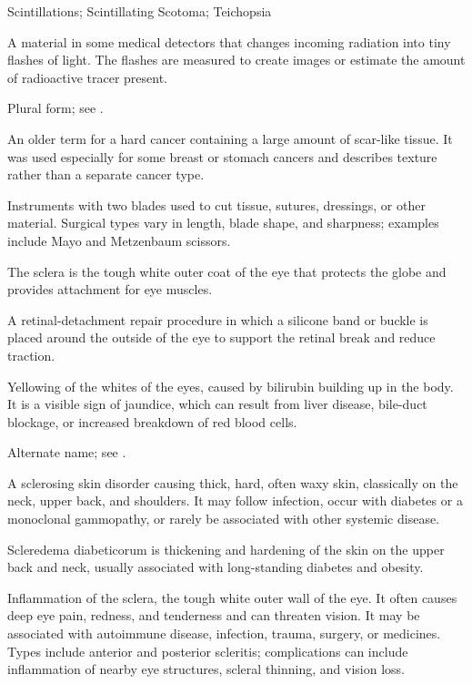 \synonyms
Scintillations; Scintillating Scotoma; Teichopsia

 A material in some medical detectors that changes incoming radiation into tiny flashes of light. The flashes are measured to create images or estimate the amount of radioactive tracer present.

 Plural form; see .

 An older term for a hard cancer containing a large amount of scar-like tissue. It was used especially for some breast or stomach cancers and describes texture rather than a separate cancer type.

 Instruments with two blades used to cut tissue, sutures, dressings, or other material. Surgical types vary in length, blade shape, and sharpness; examples include Mayo and Metzenbaum scissors.

 The sclera is the tough white outer coat of the eye that protects the globe and provides attachment for eye muscles.

 A retinal-detachment repair procedure in which a silicone band or buckle is placed around the outside of the eye to support the retinal break and reduce traction.

 Yellowing of the whites of the eyes, caused by bilirubin building up in the body. It is a visible sign of jaundice, which can result from liver disease, bile-duct blockage, or increased breakdown of red blood cells.

 Alternate name; see .

 A sclerosing skin disorder causing thick, hard, often waxy skin, classically on the neck, upper back, and shoulders. It may follow infection, occur with diabetes or a monoclonal gammopathy, or rarely be associated with other systemic disease.

 Scleredema diabeticorum is thickening and hardening of the skin on the upper back and neck, usually associated with long-standing diabetes and obesity.

 Inflammation of the sclera, the tough white outer wall of the eye. It often causes deep eye pain, redness, and tenderness and can threaten vision. It may be associated with autoimmune disease, infection, trauma, surgery, or medicines. Types include anterior and posterior scleritis; complications can include inflammation of nearby eye structures, scleral thinning, and vision loss.

